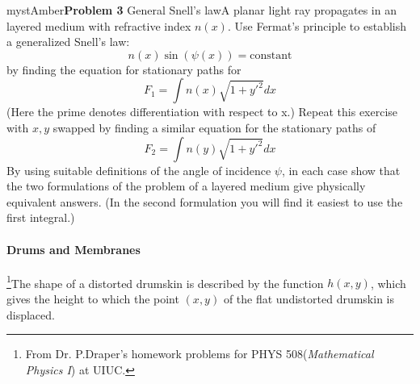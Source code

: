 \begin{mystadmonition}{mystAmber}{\textbf{Problem 3} General Snell's law}A planar light ray propagates in an layered medium with refractive index $n(x)$. Use Fermat's principle to establish a generalized Snell's law:
\begin{equation}
n(x)\sin(\psi(x))=\text{constant}
\end{equation}
by finding the equation for stationary paths for
\begin{equation}
F_1=\int n(x)\sqrt{1+y'^2}dx
\end{equation}
(Here the prime denotes differentiation with respect to x.) Repeat this exercise with $x,y$ swapped by finding a similar equation for the stationary paths of
\begin{equation}
F_2=\int n(y)\sqrt{1+y'^2}dx
\end{equation}
By using suitable definitions of the angle of incidence $\psi$, in each case show that the two formulations of the problem of a layered medium give physically equivalent answers.
(In the second formulation you will find it easiest to use the first integral.)

\end{mystadmonition}
\paragraph{Drums and Membranes }

\footnote{From Dr. P.Draper's homework problems for PHYS 508(\textit{Mathematical Physics I}) at UIUC.}The shape of a distorted drumskin is described by the
function $h(x, y)$, which gives the height to which the point $(x, y)$ of the flat undistorted drumskin is displaced.

